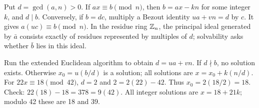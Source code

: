 Put $d=\gcd(a,n)>0$. If $ax\equiv b\pmod n$, then $b=ax-kn$ for some integer $k$, and $d\mid b$. Conversely, if $b=dc$, multiply a Bezout identity $ua+vn=d$ by $c$. It gives $a(uc)\equiv b\pmod n$. In the residue ring $\mathbb{Z}_n$, the principal ideal generated by $\bar a$ consists exactly of residues represented by multiples of $d$; solvability asks whether $\bar b$ lies in this ideal.

Run the extended Euclidean algorithm to obtain $d=ua+vn$. If $d\nmid b$, no solution exists. Otherwise $x_0=u(b/d)$ is a solution; all solutions are $x=x_0+k(n/d)$.
For $22x\equiv18\pmod{42}$, $d=2$ and $2=2(22)-42$. Thus $x_0=2(18/2)=18$. Check: $22(18)-18=378=9(42)$. All integer solutions are $x=18+21k$; modulo 42 these are 18 and 39.
